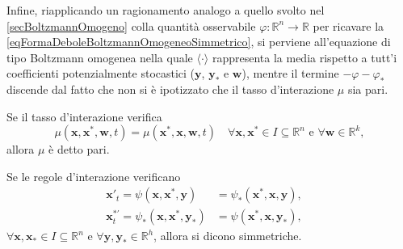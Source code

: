         Infine, riapplicando un ragionamento analogo a quello svolto nel \cref{secBoltzmannOmogeno} colla quantità osservabile \(\varphi\colon\mathbb R^n\to\mathbb R\) per ricavare la \ref{eqFormaDeboleBoltzmannOmogeneoSimmetrico}, si perviene all'equazione di tipo Boltzmann omogenea
        nella quale \(\langle\cdot\rangle\) rappresenta la media rispetto a tutt'i coefficienti potenzialmente stocastici (\(\mathbf y\), \(\mathbf y_*\) e \(\mathbf w\)), mentre il termine \(-\varphi-\varphi_*\) discende dal fatto che non si è ipotizzato che il tasso d'interazione \(\mu\) sia pari.

        \begin{dfn}
          \label{defNucleoInterazionePari}
          Se il tasso d'interazione verifica
          \[
            \mu(\mathbf x,\mathbf x^*,\mathbf w,t)=\mu(\mathbf x^*,\mathbf x,\mathbf w,t)
            \quad\forall\mathbf x,\mathbf x^*\in I\subseteq\mathbb R^n
            \text{ e }\forall\mathbf w\in\mathbb R^k,
          \]
          allora \(\mu\) è detto pari.
        \end{dfn}

        \begin{dfn}
          \label{defLeggiInterazioneSimmetriche}
          Se le regole d'interazione verificano
          \[
            \begin{aligned}
              \mathbf x'_t=\psi(\mathbf x,\mathbf x^*,\mathbf y)&=\psi_*(\mathbf x^*,\mathbf x,\mathbf y),\\
              \mathbf x^{*\prime}_t=\psi_*(\mathbf x,\mathbf x^*,\mathbf y_*)&=\psi(\mathbf x^*,\mathbf x,\mathbf y_*),
            \end{aligned}
            \quad
          \]
          \(\forall\mathbf x,\mathbf x_*\in I\subseteq\mathbb R^n\) e \(\forall\mathbf y,\mathbf y_*\in\mathbb R^h\), allora si dicono simmetriche.%
        \end{dfn}
        
